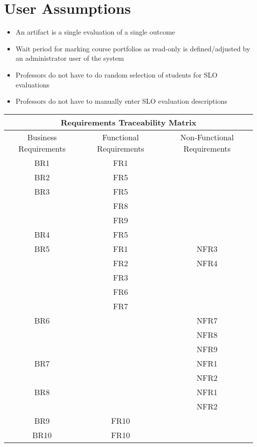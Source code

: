 \documentclass[a4paper,12pt]{article}
\begin{document}
\section*{User Assumptions}
\begin{itemize}
\item An artifact is a single evaluation of a single outcome 
\item Wait period for marking course portfolios as read-only is defined/adjusted by an administrator user of the system 
\item Professors do not have to do random selection of students for SLO evaluations 
\item Professors do not have to manually enter SLO evaluation descriptions 
\end{itemize}

\setlength{\tabcolsep}{10pt}
\renewcommand{\arraystretch}{1.5}
\begin{tabular}{ |c|c|c| }
 \hline
 \multicolumn{3}{|c|}{Requirements Traceability Matrix} \\
 \hline
 Business Requirements & Functional Requirements & Non-Functional Requirements\\
 \hline
 BR1 & FR1 & \\
 BR2 & FR5 & \\
 BR3 & FR5 & \\
     & FR8 & \\
     & FR9 & \\
 BR4 & FR5 & \\
 BR5 & FR1 & NFR3\\
     & FR2 & NFR4\\
     & FR3 & \\
     & FR6 & \\
     & FR7 & \\
 BR6 &     & NFR7\\
     &     & NFR8\\
     &     & NFR9\\
 BR7 &     & NFR1\\
     &     & NFR2\\
 BR8 &     & NFR1\\
     &     & NFR2\\
 BR9 & FR10 & \\
 BR10 & FR10 & \\
 \hline
\end{tabular}
\end{document}
